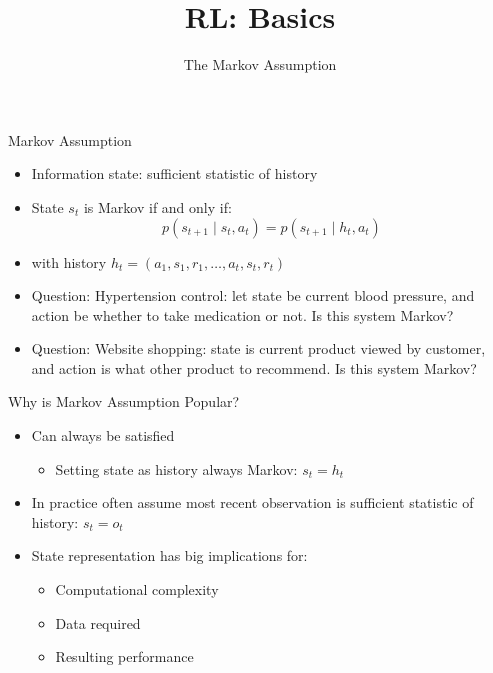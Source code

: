 


\title[Reinforcement Learning: Basics]{RL: Basics}
\subtitle{The Markov Assumption}




	
	\maketitle

\begin{frame}[c]{Markov Assumption}

\begin{itemize}
	\item Information state: sufficient statistic of history
	\item State $s_t$ is Markov if and only if:
	$$ p(s_{t+1} \mid s_t, a_t) = p(s_{t+1} \mid h_t, a_t)$$
	\item with history $h_t = (a_1, s_1, r_1, \ldots, a_t, s_t, r_t)$
	\pause
	\medskip
	\item \alert{Question:} Hypertension control: let state be current blood pressure, and action be whether to take medication or not. Is this system Markov?
	\item \alert{Question:} Website shopping: state is current product viewed by customer, and action is what other product to recommend. Is this system Markov?
\end{itemize}

\end{frame}
\begin{frame}[c]{Why is Markov Assumption Popular?}
	
	\begin{itemize}
		\item Can always be satisfied
		\begin{itemize}
			\item Setting state as history always Markov: $s_t = h_t$
		\end{itemize}
		\item In practice often assume most recent observation is sufficient statistic
		of history: $s_t = o_t$
		\item State representation has big implications for:
		\begin{itemize}
			\item Computational complexity
			\item Data required
			\item Resulting performance
		\end{itemize}
	\end{itemize}
	
\end{frame}



